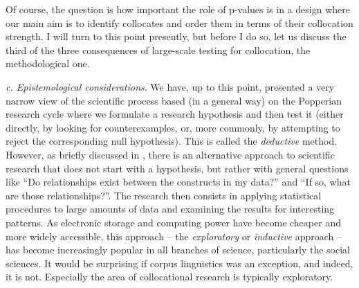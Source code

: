 Of course, the question is how important the role of p\hyp{}values is in a design  where our main aim is to identify collocates  and order them in terms of their collocation strength. I will turn to this point presently, but before I do so, let us discuss the third of the three consequences of large\hyp{}scale testing for collocation, the methodological one.

\textit{c. Epistemological considerations}.  We have, up to this point, presented a very narrow view of the scientific process based (in a general way) on the Popperian research cycle where we formulate a research hypothesis and then test it (either directly, by looking for counterexamples,  or, more commonly, by attempting to reject the corresponding null hypothesis).  This is called the \textit{deductive}  method. However, as briefly discussed in , there is an alternative approach to scientific research that does not start with a hypothesis, but rather with general questions like ``Do relationships exist between the constructs in my data?'' and ``If so, what are those relationships?''. The research then consists in applying statistical procedures to large amounts of data and examining the results for interesting patterns. As electronic storage and computing power have become cheaper and more widely accessible, this approach -- the \textit{exploratory}  or \textit{inductive}  approach -- has become increasingly popular in all branches of science, particularly the social sciences. It would be surprising if corpus linguistics was an exception, and indeed, it is not. Especially the area of collocational  research is typically  exploratory.

